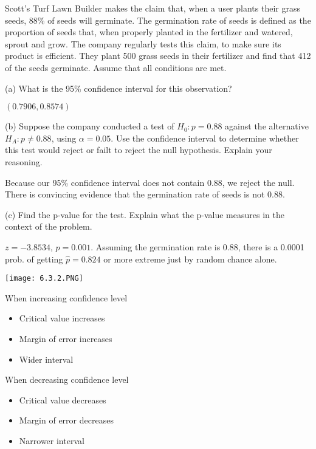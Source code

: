 \documentclass[../stats.tex]{subfiles}
\begin{document}
\pagebreak
\begin{example}
    Scott's Turf Lawn Builder makes the claim that, when a user plants their grass seeds, 88\% of seeds will germinate. The germination rate of seeds is defined as the proportion of seeds that, when properly planted in the fertilizer and watered, sprout and grow. The company regularly tests this claim, to make sure its product is efficient. 
    They plant 500 grass seeds in their fertilizer and find that 412 of the seeds germinate. Assume that all conditions are met.

    (a) What is the 95\% confidence interval for this observation?

    $(0.7906, 0.8574)$

    (b) Suppose the company conducted a test of $H_0: p=0.88$ against the alternative $H_A: p\neq 0.88$, using $\alpha=0.05$. Use the confidence interval to determine whether this test would reject or failt to reject the null hypothesis. Explain your reasoning.

    Because our 95\% confidence interval does not contain 0.88, we reject the null. There is convincing evidence that the germination rate of seeds is not 0.88.

    (c) Find the p-value for the test. Explain what the p-value measures in the context of the problem.

    $z=-3.8534$, $p=0.001$. Assuming the germination rate is 0.88, there is a 0.0001 prob. of getting $\hat{p}=0.824$ or more extreme just by random chance alone.
\end{example}

\begin{center}
    \texttt{[image: 6.3.2.PNG]}
\end{center}

When increasing confidence level 
\begin{itemize}
    \item Critical value increases 
    \item Margin of error increases 
    \item Wider interval 
\end{itemize}

When decreasing confidence level 
\begin{itemize}
    \item Critical value decreases 
    \item Margin of error decreases
    \item Narrower interval 
\end{itemize}
\end{document}
